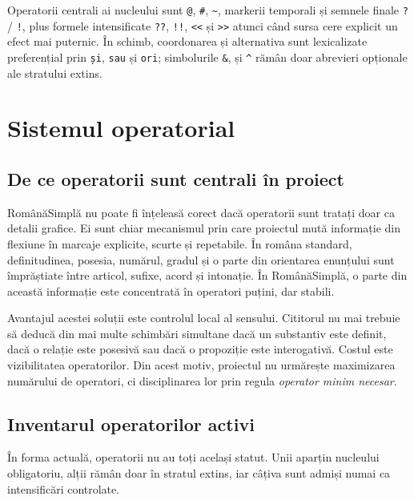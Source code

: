 \documentclass[12pt,onecolumn,letterpaper]{article}
\newcommand{\rs}[1]{\texttt{#1}}
\begin{document}
Operatorii centrali ai nucleului sunt \rs{@}, \rs{\#}, \rs{\textasciitilde{}}, markerii
temporali și semnele finale \rs{?} / \rs{!}, plus formele intensificate
\rs{??}, \rs{!!}, \rs{<<} și \rs{>>} atunci când sursa cere explicit un efect
mai puternic. În schimb, coordonarea și alternativa sunt lexicalizate
preferențial prin \rs{și}, \rs{sau} și \rs{ori}; simbolurile \rs{\&}, \rs{\textbar{}}
și \rs{\textasciicircum{}} rămân doar abrevieri opționale ale stratului extins.

\section{Sistemul operatorial}

\subsection{De ce operatorii sunt centrali în proiect}

RomânăSimplă nu poate fi înțeleasă corect dacă operatorii sunt tratați doar ca
detalii grafice. Ei sunt chiar mecanismul prin care proiectul mută informație
din flexiune în marcaje explicite, scurte și repetabile. În româna standard,
definitudinea, posesia, numărul, gradul și o parte din orientarea enunțului sunt
împrăștiate între articol, sufixe, acord și intonație. În RomânăSimplă, o parte
din această informație este concentrată în operatori puțini, dar stabili.

Avantajul acestei soluții este controlul local al sensului. Cititorul nu mai
trebuie să deducă din mai multe schimbări simultane dacă un substantiv este
definit, dacă o relație este posesivă sau dacă o propoziție este interogativă.
Costul este vizibilitatea operatorilor. Din acest motiv, proiectul nu urmărește
maximizarea numărului de operatori, ci disciplinarea lor prin regula
\textit{operator minim necesar}.

\subsection{Inventarul operatorilor activi}

În forma actuală, operatorii nu au toți același statut. Unii aparțin nucleului
obligatoriu, alții rămân doar în stratul extins, iar câțiva sunt admiși numai ca
intensificări controlate.
\end{document}

